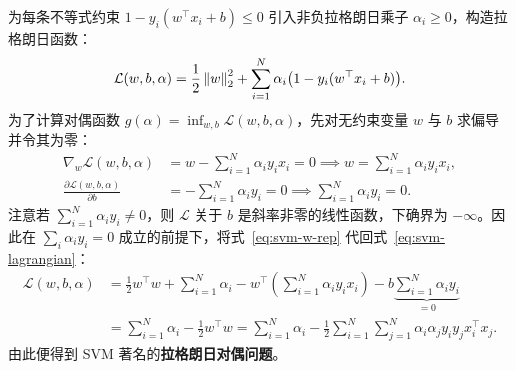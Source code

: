 为每条不等式约束 $1 - y_i(w^\top x_i + b) \le 0$ 引入非负拉格朗日乘子 $\alpha_i \ge 0$，构造拉格朗日函数：
\begin{equation}\label{eq:svm-lagrangian}
  \mathcal{L}(w, b, \alpha) = \frac{1}{2}\left\|w\right\|_2^2 + \sum_{i=1}^{N} \alpha_i \big(1 - y_i(w^\top x_i + b)\big).
\end{equation}
为了计算对偶函数 $g(\alpha) = \inf_{w, b} \mathcal{L}(w, b, \alpha)$，先对无约束变量 $w$ 与 $b$ 求偏导并令其为零：
\begin{align}
  \nabla_w \mathcal{L}(w, b, \alpha) &= w - \sum_{i=1}^{N} \alpha_i y_i x_i = 0 \implies w = \sum_{i=1}^{N} \alpha_i y_i x_i, \label{eq:svm-w-rep}\\
  \frac{\partial \mathcal{L}(w, b, \alpha)}{\partial b} &= -\sum_{i=1}^{N} \alpha_i y_i = 0 \implies \sum_{i=1}^{N} \alpha_i y_i = 0. \label{eq:svm-b-cond}
\end{align}
注意若 $\sum_{i=1}^N \alpha_i y_i \neq 0$，则 $\mathcal{L}$ 关于 $b$ 是斜率非零的线性函数，下确界为 $-\infty$。因此在 $\sum_i \alpha_i y_i = 0$ 成立的前提下，将式~\eqref{eq:svm-w-rep} 代回式~\eqref{eq:svm-lagrangian}：
\begin{align*}
  \mathcal{L}(w, b, \alpha)
  &= \frac{1}{2} w^\top w + \sum_{i=1}^{N} \alpha_i - w^\top \!\left(\sum_{i=1}^{N} \alpha_i y_i x_i\right) - b \underbrace{\sum_{i=1}^{N} \alpha_i y_i}_{=0} \\
  &= \sum_{i=1}^{N} \alpha_i - \frac{1}{2} w^\top w
   = \sum_{i=1}^{N} \alpha_i - \frac{1}{2}\sum_{i=1}^{N}\sum_{j=1}^{N} \alpha_i \alpha_j y_i y_j x_i^\top x_j.
\end{align*}
由此便得到 SVM 著名的\textbf{拉格朗日对偶问题}。

